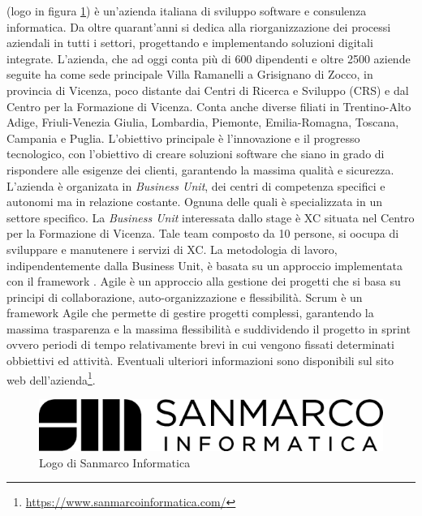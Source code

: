 \myCompany (logo in figura \ref{fig:entanglement}) è un'azienda italiana di sviluppo software e consulenza informatica. Da oltre quarant'anni si dedica alla riorganizzazione dei processi aziendali in tutti i settori, progettando e implementando soluzioni digitali integrate. 
\newline
L'azienda, che ad oggi conta più di 600 dipendenti e oltre 2500 aziende seguite ha come sede principale Villa Ramanelli a Grisignano di Zocco, in provincia di Vicenza, poco distante dai Centri di Ricerca e Sviluppo (CRS) e dal Centro per la Formazione di Vicenza. Conta anche diverse filiati in Trentino-Alto Adige, Friuli-Venezia Giulia, Lombardia, Piemonte, Emilia-Romagna, Toscana, Campania e Puglia. 
\newline
L'obiettivo principale è l'innovazione e il progresso tecnologico, con l'obiettivo di creare soluzioni software che siano in grado di rispondere alle esigenze dei clienti, garantendo la massima qualità e sicurezza.
\newline
L'azienda è organizata in \emph{Business Unit}, dei centri di competenza specifici e autonomi ma in relazione costante. Ognuna delle quali è specializzata in un settore specifico. La \emph{Business Unit} interessata dallo stage è XC situata nel Centro per la Formazione di Vicenza. Tale team composto da 10 persone, si oocupa di sviluppare e manutenere i servizi di XC.
\newline
La metodologia di lavoro, indipendentemente dalla Business Unit, è basata su un approccio  implementata con il framework . Agile è un approccio alla gestione dei progetti che si basa su principi di collaborazione, auto-organizzazione e flessibilità. Scrum è un framework Agile che permette di gestire progetti complessi, garantendo la massima trasparenza e la massima flessibilità e suddividendo il progetto in sprint ovvero periodi di tempo relativamente brevi in cui vengono fissati determinati obbiettivi ed attività. 
\newline
Eventuali ulteriori informazioni sono disponibili sul sito web dell'azienda\footnote{\url{https://www.sanmarcoinformatica.com/}}.
\begin{figure}[h!]
    \centering
    \includegraphics[width=0.5\columnwidth]{img/logo_sanmarco_informatica.png}
    \caption{Logo di Sanmarco Informatica}
    \label{fig:entanglement}
\end{figure}
